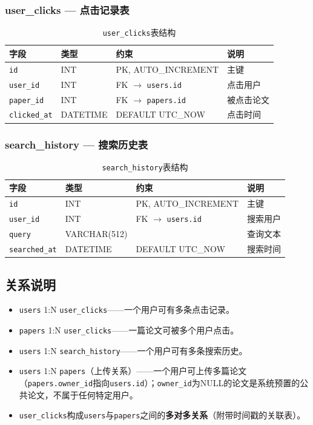 \documentclass[12pt,a4paper]{ctexart}
\newcommand{\code}[1]{\texttt{#1}}
\begin{document}
\subsubsection{user\_clicks — 点击记录表}

\begin{table}[H]
\centering
\caption{\code{user\_clicks}表结构}
\begin{tabular}{lllp{5cm}}
\toprule
\textbf{字段} & \textbf{类型} & \textbf{约束} & \textbf{说明} \\
\midrule
\code{id}          & INT      & PK, AUTO\_INCREMENT     & 主键 \\
\code{user\_id}    & INT      & FK $\to$ \code{users.id} & 点击用户 \\
\code{paper\_id}   & INT      & FK $\to$ \code{papers.id}& 被点击论文 \\
\code{clicked\_at} & DATETIME & DEFAULT UTC\_NOW         & 点击时间 \\
\bottomrule
\end{tabular}
\end{table}

\subsubsection{search\_history — 搜索历史表}

\begin{table}[H]
\centering
\caption{\code{search\_history}表结构}
\begin{tabular}{lllp{5cm}}
\toprule
\textbf{字段} & \textbf{类型} & \textbf{约束} & \textbf{说明} \\
\midrule
\code{id}           & INT          & PK, AUTO\_INCREMENT     & 主键 \\
\code{user\_id}     & INT          & FK $\to$ \code{users.id} & 搜索用户 \\
\code{query}        & VARCHAR(512) &                          & 查询文本 \\
\code{searched\_at} & DATETIME     & DEFAULT UTC\_NOW         & 搜索时间 \\
\bottomrule
\end{tabular}
\end{table}

\subsection{关系说明}

\begin{itemize}
\item \code{users} 1:N \code{user\_clicks}——一个用户可有多条点击记录。
\item \code{papers} 1:N \code{user\_clicks}——一篇论文可被多个用户点击。
\item \code{users} 1:N \code{search\_history}——一个用户可有多条搜索历史。
\item \code{users} 1:N \code{papers}（上传关系）——一个用户可上传多篇论文（\code{papers.owner\_id}指向\code{users.id}）；\code{owner\_id}为NULL的论文是系统预置的公共论文，不属于任何特定用户。
\item \code{user\_clicks}构成\code{users}与\code{papers}之间的\textbf{多对多关系}（附带时间戳的关联表）。
\end{itemize}
\end{document}
